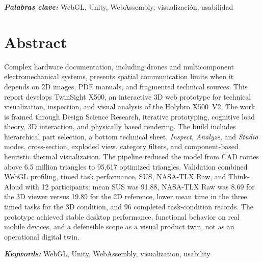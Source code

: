 \documentclass[12pt,letterpaper]{article}
\begin{document}
\hspace{1.27cm}\textit{\textbf{Palabras clave:}} WebGL, Unity, WebAssembly, visualización, usabilidad

\section*{Abstract}
Complex hardware documentation, including drones and multicomponent electromechanical systems, presents spatial communication limits when it depends on 2D images, PDF manuals, and fragmented technical sources. This report develops TwinSight X500, an interactive 3D web prototype for technical visualization, inspection, and visual analysis of the Holybro X500~V2. The work is framed through Design Science Research, iterative prototyping, cognitive load theory, 3D interaction, and physically based rendering. The build includes hierarchical part selection, a bottom technical sheet, \textit{Inspect}, \textit{Analyze}, and \textit{Studio} modes, cross-section, exploded view, category filters, and component-based heuristic thermal visualization. The pipeline reduced the model from CAD routes above 6.5 million triangles to 95,617 optimized triangles. Validation combined WebGL profiling, timed task performance, SUS, NASA-TLX Raw, and Think-Aloud with 12 participants: mean SUS was 91.88, NASA-TLX Raw was 8.69 for the 3D viewer versus 19.89 for the 2D reference, lower mean time in the three timed tasks for the 3D condition, and 96 completed task-condition records. The prototype achieved stable desktop performance, functional behavior on real mobile devices, and a defensible scope as a visual product twin, not as an operational digital twin.

\hspace{1.27cm}\textit{\textbf{Keywords:}} WebGL, Unity, WebAssembly, visualization, usability

\setlength{\parindent}{1.27cm}

\clearpage
\tableofcontents

\clearpage
\listoftables

\clearpage
\listoffigures
\end{document}
